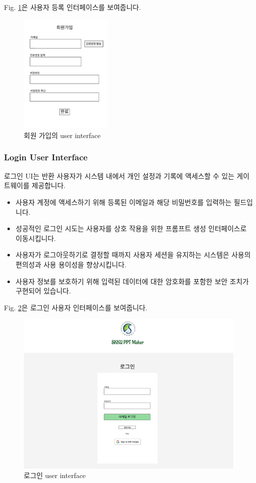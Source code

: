 \documentclass[a4paper, 12pt]{article}
\begin{document}
Fig. \ref{fig:signup}은 사용자 등록 인터페이스를 보여줍니다.

\begin{figure}[H]
\centering
\includegraphics[width=0.4\textwidth]{img/signup.png}
\caption{회원 가입의 user interface}
\label{fig:signup}
\end{figure}

\subsubsection{Login User Interface}

로그인 UI는 반환 사용자가 시스템 내에서 개인 설정과 기록에 액세스할 수 있는 게이트웨이를 제공합니다.

\begin{itemize}
\item 사용자 계정에 액세스하기 위해 등록된 이메일과 해당 비밀번호를 입력하는 필드입니다.
\item 성공적인 로그인 시도는 사용자를 상호 작용을 위한 프롬프트 생성 인터페이스로 이동시킵니다.
\item 사용자가 로그아웃하기로 결정할 때까지 사용자 세션을 유지하는 시스템은 사용의 편의성과 사용 용이성을 향상시킵니다.
\item 사용자 정보를 보호하기 위해 입력된 데이터에 대한 암호화를 포함한 보안 조치가 구현되어 있습니다.
\end{itemize}

Fig. \ref{fig:login}은 로그인 사용자 인터페이스를 보여줍니다.

\begin{figure}[H]
\centering
\includegraphics[width=1\textwidth]{img/login.png}
\caption{로그인 user interface}
\label{fig:login}
\end{figure}
\end{document}
